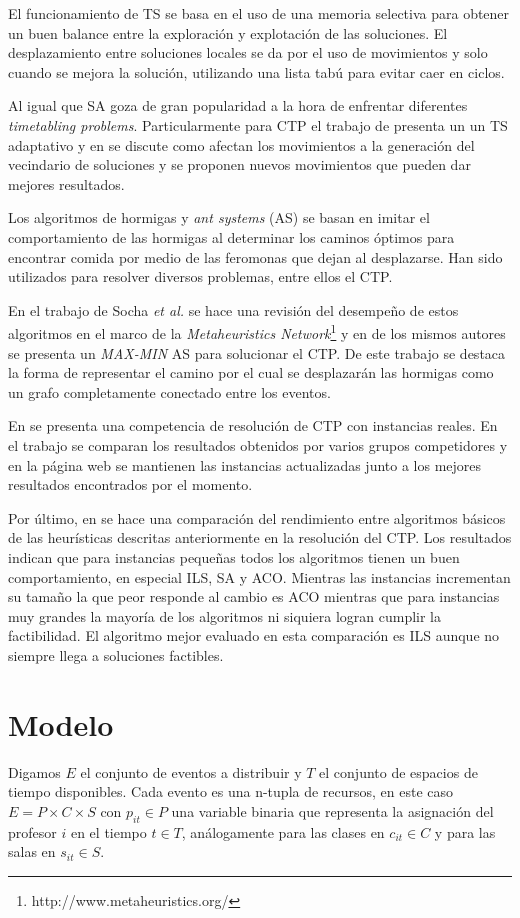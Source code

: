 \documentclass[letter, 10pt]{article}
\begin{document}
El funcionamiento de TS se basa en el uso de una memoria selectiva para obtener
un buen balance entre la exploración y explotación de las soluciones. El
desplazamiento entre soluciones locales se da por el uso de movimientos y solo
cuando se mejora la solución, utilizando una lista tabú para evitar caer en
ciclos.

Al igual que SA goza de gran popularidad a la hora de enfrentar
diferentes \emph{timetabling problems}. Particularmente para CTP el trabajo de
\cite{lu2010adaptive} presenta un un TS adaptativo y en \cite{aladag2009effect}
se discute como afectan los movimientos a la generación del vecindario de
soluciones y se proponen nuevos movimientos que pueden dar mejores resultados.

Los algoritmos de hormigas y \emph{ant systems} (AS) se basan en imitar el
comportamiento de las hormigas al determinar los caminos óptimos para encontrar
comida por medio de las feromonas que dejan al desplazarse.
Han sido utilizados para resolver diversos problemas, entre ellos el CTP.

En el trabajo de Socha \emph{et al.}\cite{socha2003ant} se hace
una revisión del desempeño de estos algoritmos en el marco de la
\emph{Metaheuristics Network}\footnote{http://www.metaheuristics.org/} y en
\cite{socha2002max} de los mismos autores se presenta un \emph{MAX-MIN} AS para
solucionar el CTP. De este trabajo se destaca la forma de representar el camino
por el cual se desplazarán las hormigas como un grafo completamente conectado
entre los eventos.

En \cite{post2016third} se presenta una competencia de resolución de CTP con
instancias reales. En el trabajo se comparan los resultados obtenidos por varios
grupos competidores y en la página web se mantienen las instancias actualizadas
junto a los mejores resultados encontrados por el momento.

Por último, en \cite{rossi2002comparison} se hace una comparación del
rendimiento entre algoritmos básicos de las heurísticas descritas anteriormente
en la resolución del CTP. Los resultados indican que para instancias pequeñas
todos los algoritmos tienen un buen comportamiento, en especial ILS, SA y ACO.
Mientras las instancias incrementan su tamaño la que peor responde al cambio
es ACO mientras que para instancias muy grandes la mayoría de los algoritmos ni
siquiera logran cumplir la factibilidad. El algoritmo mejor evaluado en esta
comparación es ILS aunque no siempre llega a soluciones factibles. 

\section{Modelo}\label{sec:mod}
Digamos $E$ el conjunto de eventos a distribuir y $T$ el conjunto de espacios de
tiempo disponibles. Cada evento es una n-tupla de recursos, en este caso $E = P
\times C \times S$ con $p_{it} \in P$ una variable binaria que representa la
asignación del profesor $i$ en el tiempo $t \in T$, análogamente para las clases
en $c_{it} \in C$ y para las salas en $s_{it} \in S$.
\end{document}

